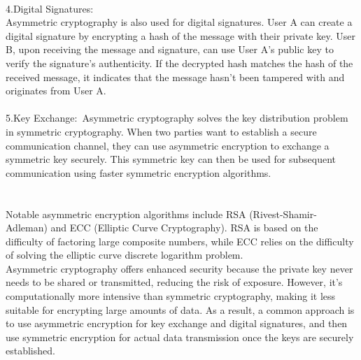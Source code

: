 \documentclass{report}
\begin{document}
\\
4.Digital Signatures:\\
Asymmetric cryptography is also used for digital signatures. User A can create a digital signature by encrypting a hash of the message with their private key. User B, upon receiving the message and signature, can use User A's public key to verify the signature's authenticity. If the decrypted hash matches the hash of the received message, it indicates that the message hasn't been tampered with and originates from User A.\\
\\
5.Key Exchange:\
Asymmetric cryptography solves the key distribution problem in symmetric cryptography. When two parties want to establish a secure communication channel, they can use asymmetric encryption to exchange a symmetric key securely. This symmetric key can then be used for subsequent communication using faster symmetric encryption algorithms.\\
\\
\\
Notable asymmetric encryption algorithms include RSA (Rivest-Shamir-Adleman) and ECC (Elliptic Curve Cryptography). RSA is based on the difficulty of factoring large composite numbers, while ECC relies on the difficulty of solving the elliptic curve discrete logarithm problem.\\
Asymmetric cryptography offers enhanced security because the private key never needs to be shared or transmitted, reducing the risk of exposure. However, it's computationally more intensive than symmetric cryptography, making it less suitable for encrypting large amounts of data. As a result, a common approach is to use asymmetric encryption for key exchange and digital signatures, and then use symmetric encryption for actual data transmission once the keys are securely established.
\end{document}
